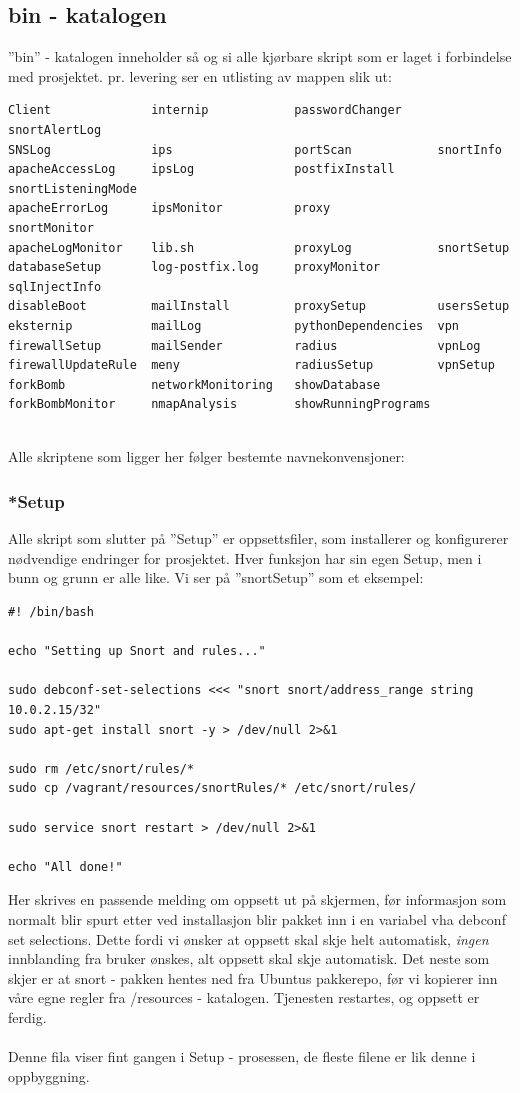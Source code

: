 \documentclass{article}
\begin{document}
\subsection{bin - katalogen}
''bin'' - katalogen inneholder så og si alle kjørbare skript som er laget i forbindelse med prosjektet. pr. levering ser en utlisting av mappen slik ut: 
\begin{lstlisting}
Client              internip            passwordChanger     snortAlertLog
SNSLog              ips                 portScan            snortInfo
apacheAccessLog     ipsLog              postfixInstall      snortListeningMode
apacheErrorLog      ipsMonitor          proxy               snortMonitor
apacheLogMonitor    lib.sh              proxyLog            snortSetup
databaseSetup       log-postfix.log     proxyMonitor        sqlInjectInfo
disableBoot         mailInstall         proxySetup          usersSetup
eksternip           mailLog             pythonDependencies  vpn
firewallSetup       mailSender          radius              vpnLog
firewallUpdateRule  meny                radiusSetup         vpnSetup
forkBomb            networkMonitoring   showDatabase
forkBombMonitor     nmapAnalysis        showRunningPrograms
\end{lstlisting}
\\
Alle skriptene som ligger her følger  bestemte navnekonvensjoner: 
\subsubsection{*Setup}
Alle skript som slutter på ''Setup'' er oppsettsfiler, som installerer og konfigurerer nødvendige endringer for prosjektet. Hver funksjon har sin egen Setup, men i bunn og grunn er alle like. Vi ser på ''snortSetup'' som et eksempel:  
\begin{lstlisting}
#! /bin/bash

echo "Setting up Snort and rules..."

sudo debconf-set-selections <<< "snort snort/address_range string 10.0.2.15/32"
sudo apt-get install snort -y > /dev/null 2>&1

sudo rm /etc/snort/rules/*
sudo cp /vagrant/resources/snortRules/* /etc/snort/rules/

sudo service snort restart > /dev/null 2>&1

echo "All done!"
\end{lstlisting}
Her skrives en passende melding om oppsett ut på skjermen, før informasjon som normalt blir spurt etter ved installasjon blir pakket inn i en variabel vha
debconf set selections. Dette fordi vi ønsker at oppsett skal skje helt automatisk, \textit{ingen} innblanding fra bruker ønskes, alt oppsett skal skje automatisk. Det neste som skjer er at snort - pakken hentes ned fra Ubuntus pakkerepo, før vi kopierer inn våre egne regler fra /resources - katalogen. 
Tjenesten restartes, og oppsett er ferdig. \\ \\
Denne fila viser fint gangen i Setup - prosessen, de fleste filene er lik denne i oppbyggning.
\end{document}
